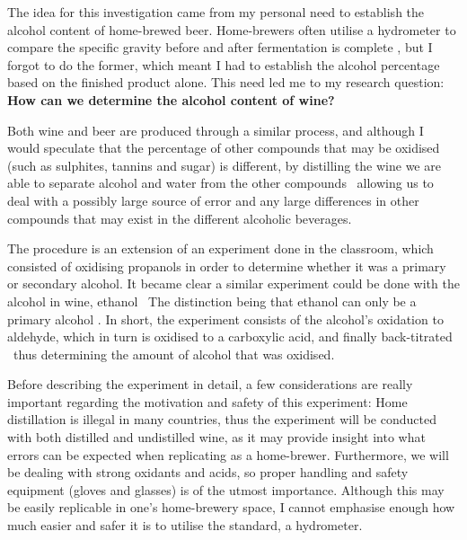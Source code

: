 The idea for this investigation came from my personal need to establish the alcohol content of home-brewed beer. Home-brewers often utilise a hydrometer to compare the specific gravity before and after fermentation is complete \citep{Flowers2014Keg}, but I forgot to do the former, which meant I had to establish the alcohol percentage based on the finished product alone. This need led me to my research question: \textbf{How can we determine the alcohol content of wine?}

Both wine and beer are produced through a similar process, and although I would speculate that the percentage of other compounds that may be oxidised (such as sulphites, tannins and sugar) is different, by distilling the wine we are able to separate alcohol and water from the other compounds \textendash\ allowing us to deal with a possibly large source of error and any large differences in other compounds that may exist in the different alcoholic beverages.

The procedure is an extension of an experiment done in the classroom, which consisted of oxidising propanols in order to determine whether it was a primary or secondary alcohol. It became clear a similar experiment could be done with the alcohol in wine, ethanol \textendash\ The distinction being that ethanol can only be a primary alcohol \citep[pp.491-493]{ChemIB2014Pearson}. In short, the experiment consists of the alcohol's oxidation to aldehyde, which in turn is oxidised to a carboxylic acid, and finally back-titrated \textendash\ thus determining the amount of alcohol that was oxidised.

Before describing the experiment in detail, a few considerations are really important regarding the motivation and safety of this experiment: Home distillation is illegal in many countries, thus the experiment will be conducted with both distilled and undistilled wine, as it may provide insight into what errors can be expected when replicating as a home-brewer. Furthermore, we will be dealing with strong oxidants and acids, so proper handling and safety equipment (gloves and glasses) is of the utmost importance. Although this may be easily replicable in one's home-brewery space, I cannot emphasise enough how much easier and safer it is to utilise the standard, a hydrometer.
